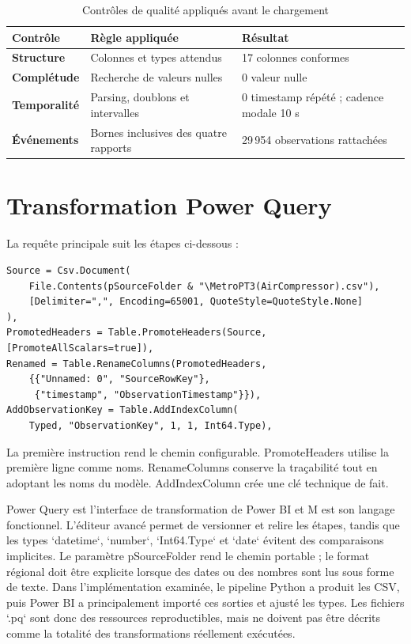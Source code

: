 \begin{table}[H]
\centering
\caption{Contrôles de qualité appliqués avant le chargement}
\label{tab:quality-controls}
\begin{tabularx}{0.94\textwidth}{>{\bfseries}l X l}
\toprule
Contrôle & Règle appliquée & Résultat\\
\midrule
Structure & Colonnes et types attendus & 17 colonnes conformes\\
Complétude & Recherche de valeurs nulles & 0 valeur nulle\\
Temporalité & Parsing, doublons et intervalles & 0 timestamp répété ; cadence modale 10 s\\
Événements & Bornes inclusives des quatre rapports & 29\,954 observations rattachées\\
\bottomrule
\end{tabularx}
\end{table}

\section{Transformation Power Query}
La requête principale suit les étapes ci-dessous :
\begin{lstlisting}[language={},caption={Extrait de la requête M FactSensorObservation}]
Source = Csv.Document(
    File.Contents(pSourceFolder & "\MetroPT3(AirCompressor).csv"),
    [Delimiter=",", Encoding=65001, QuoteStyle=QuoteStyle.None]
),
PromotedHeaders = Table.PromoteHeaders(Source, [PromoteAllScalars=true]),
Renamed = Table.RenameColumns(PromotedHeaders,
    {{"Unnamed: 0", "SourceRowKey"},
     {"timestamp", "ObservationTimestamp"}}),
AddObservationKey = Table.AddIndexColumn(
    Typed, "ObservationKey", 1, 1, Int64.Type),
\end{lstlisting}
La première instruction rend le chemin configurable. PromoteHeaders utilise la première ligne comme noms. RenameColumns conserve la traçabilité tout en adoptant les noms du modèle. AddIndexColumn crée une clé technique de fait.

Power Query est l'interface de transformation de Power BI et M est son langage fonctionnel. L'éditeur avancé permet de versionner et relire les étapes, tandis que les types `datetime`, `number`, `Int64.Type` et `date` évitent des comparaisons implicites. Le paramètre pSourceFolder rend le chemin portable ; le format régional doit être explicite lorsque des dates ou des nombres sont lus sous forme de texte. Dans l'implémentation examinée, le pipeline Python a produit les CSV, puis Power BI a principalement importé ces sorties et ajusté les types. Les fichiers `.pq` sont donc des ressources reproductibles, mais ne doivent pas être décrits comme la totalité des transformations réellement exécutées.

